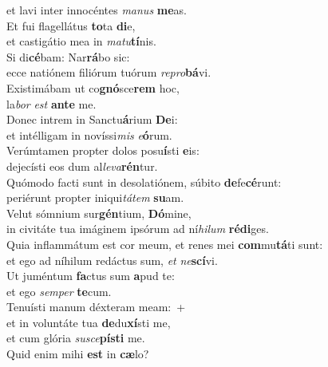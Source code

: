 \oddverse et lavi inter innocéntes \textit{ma}\textit{nus} \textbf{me}as.\\
\evenverse Et fui flagellátus \textbf{to}ta \textbf{di}e,~\*\\
\evenverse et castigátio mea in \textit{ma}\textit{tu}\textbf{tí}nis.\\
\oddverse Si di\textbf{cé}bam: Nar\textbf{rá}bo sic:~\*\\
\oddverse ecce natiónem filiórum tuórum \textit{re}\textit{pro}\textbf{bá}vi.\\
\evenverse Existimábam ut co\textbf{gnó}sce\textbf{rem} hoc,~\*\\
\evenverse la\textit{bor} \textit{est} \textbf{an}\textbf{te} me.\\
\oddverse Donec intrem in Sanctu\textbf{á}rium \textbf{De}i:~\*\\
\oddverse et intélligam in novíssi\textit{mis} \textit{e}\textbf{ó}rum.\\
\evenverse Verúmtamen propter dolos posu\textbf{í}sti \textbf{e}is:~\*\\
\evenverse dejecísti eos dum al\textit{le}\textit{va}\textbf{rén}tur.\\
\oddverse Quómodo facti sunt in desolatiónem, súbito \textbf{de}fe\textbf{cé}runt:~\*\\
\oddverse periérunt propter iniqui\textit{tá}\textit{tem} \textbf{su}am.\\
\evenverse Velut sómnium sur\textbf{gén}tium, \textbf{Dó}mine,~\*\\
\evenverse in civitáte tua imáginem ipsórum ad ní\textit{hi}\textit{lum} \textbf{ré}\textbf{di}ges.\\
\oddverse Quia inflammátum est cor meum, et renes mei \textbf{com}mu\textbf{tá}ti sunt:~\*\\
\oddverse et ego ad níhilum redáctus sum, \textit{et} \textit{ne}\textbf{scí}vi.\\
\evenverse Ut juméntum \textbf{fa}ctus sum \textbf{a}pud te:~\*\\
\evenverse et ego \textit{sem}\textit{per} \textbf{te}cum.\\
\oddverse Tenuísti manum déxteram meam:~+\\
\oddverse  et in voluntáte tua \textbf{de}du\textbf{xí}sti me,~\*\\
\oddverse et cum glória \textit{su}\textit{sce}\textbf{pí}\textbf{sti} me.\\
\evenverse Quid enim mihi \textbf{est} in \textbf{cæ}lo?~\*\\
